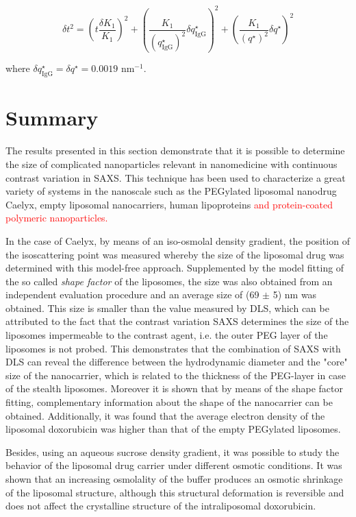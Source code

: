 \begin{equation}
\delta t^2 = \left( t \frac{\delta K_1}{K_1} \right)^2 + \left( \frac{K_1}{\left(q^{\star}_{\text{IgG}}\right)^2} \delta q^{\star}_{\text{IgG}} \right)^2 + \left( \frac{K_1}{\left(q^{\star}\right)^2} \delta q^{\star}\right)^2
\end{equation}

where $\delta q^{\star}_{\text{IgG}}=\delta q^{\star}=0.0019$ nm$^{-1}$.

\section{Summary}
The results presented in this section demonstrate that it is possible to determine the size of complicated nanoparticles relevant in nanomedicine with continuous contrast variation in SAXS. This technique has been used to characterize a great variety of systems in the nanoscale such as the PEGylated liposomal nanodrug Caelyx\textregistered, empty liposomal nanocarriers, human lipoproteins \textcolor{red}{and protein-coated polymeric nanoparticles.}

In the case of Caelyx\textregistered, by means of an iso-osmolal density gradient, the position of the isoscattering point was measured whereby the size of the liposomal drug was determined with this model-free approach. Supplemented by the model fitting of the so called \emph{shape factor} of the liposomes, the size was also obtained from an independent evaluation procedure and an average size of (69 $\pm$ 5) nm was obtained. This size is smaller than the value measured by DLS, which can be attributed to the fact that the contrast variation SAXS determines the size of the liposomes impermeable to the contrast agent, i.e. the outer PEG layer of the liposomes is not probed. This demonstrates that the combination of SAXS with DLS can reveal the difference between the hydrodynamic diameter and the "core" size of the nanocarrier, which is related to the thickness of the PEG-layer in case of the stealth liposomes. Moreover it is shown that by means of the shape factor fitting, complementary information about the shape of the nanocarrier can be obtained. Additionally, it was found that the average electron density of the liposomal doxorubicin was higher than that of the empty PEGylated liposomes.

Besides, using an aqueous sucrose density gradient, it was possible to study the behavior of the liposomal drug carrier under different osmotic conditions. It was shown that an increasing osmolality of the buffer produces an osmotic shrinkage of the liposomal structure, although this structural deformation is reversible and does not affect the crystalline structure of the intraliposomal doxorubicin.

